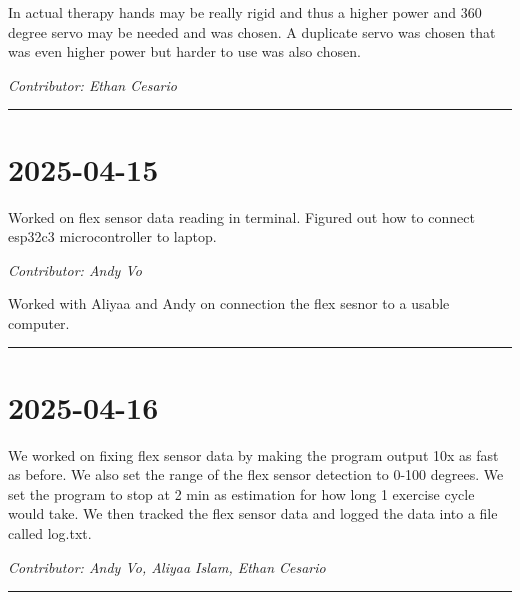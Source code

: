 \documentclass[12pt]{article}
\begin{document}
In actual therapy hands may be really rigid and thus a higher power and 360 degree servo may be needed and was chosen. A duplicate servo was chosen that was even higher power but harder to use was also chosen.

\vspace{1em}
\noindent\textit{Contributor: Ethan Cesario}
\vspace{1em}
\hrule


\section*{2025-04-15}
Worked on flex sensor data reading in terminal. Figured out how to connect esp32c3 microcontroller to laptop.


\vspace{1em}
\noindent\textit{Contributor: Andy Vo}
\vspace{1em}

Worked with Aliyaa and Andy on connection the flex sesnor to a usable computer.
\hrule

\section*{2025-04-16}
We worked on fixing flex sensor data by making the program output 10x as fast as before. We also set the range of the flex sensor detection to 0-100 degrees. 
We set the program to stop at 2 min as estimation for how long 1 exercise cycle would take. We then tracked the flex sensor data and logged the data into a file called log.txt.


\vspace{1em}
\noindent\textit{Contributor: Andy Vo, Aliyaa Islam, Ethan Cesario}
\vspace{1em}
\hrule
\end{document}
